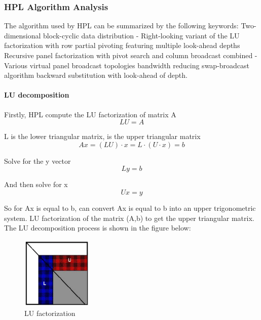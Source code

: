 \documentclass[a4paper,12pt]{article}
\begin{document}
\subsubsection{HPL Algorithm Analysis}

The algorithm used by HPL can be summarized by the following keywords: Two-dimensional block-cyclic data distribution - Right-looking variant of the LU factorization with row partial pivoting featuring multiple look-ahead depths Recursive panel factorization with pivot search and column broadcast combined - Various virtual panel broadcast topologies bandwidth reducing swap-broadcast algorithm backward substitution with look-ahead of depth.

\paragraph{LU decomposition}

Firstly, HPL compute the LU factorization of matrix A
\begin{equation*}
LU=A
\end{equation*}

L is the lower triangular matrix, is the upper triangular matrix
\begin{equation*}
Ax=(LU) \cdot x=L \cdot (U \cdot x)=b
\end{equation*}

Solve for the y vector
\begin{equation*}
Ly=b
\end{equation*}

And then solve for x
\begin{equation*}
U x=y
\end{equation*}

So for Ax is equal to b, can convert Ax is equal to b into an upper trigonometric system. LU factorization of the matrix (A,b) to get the upper triangular matrix. The LU decomposition process is shown in the figure below:

\begin{figure}[H]
    \centering
    \includegraphics[width=0.3\textwidth]{LU_factorization.png}
    \caption{LU factorization}
    \label{fig:lu_factorization}
\end{figure}
\end{document}
